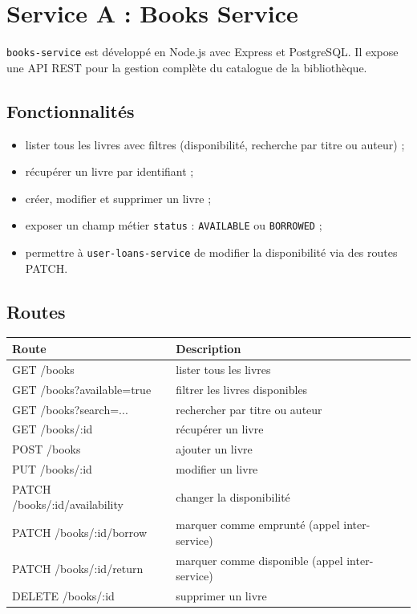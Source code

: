\documentclass[12pt,a4paper]{article}
\begin{document}
\section{Service A : Books Service}

\texttt{books-service} est développé en Node.js avec Express et PostgreSQL.
Il expose une API REST pour la gestion complète du catalogue de la bibliothèque.

\subsection{Fonctionnalités}

\begin{itemize}[leftmargin=*]
  \item lister tous les livres avec filtres (disponibilité, recherche par titre ou auteur) ;
  \item récupérer un livre par identifiant ;
  \item créer, modifier et supprimer un livre ;
  \item exposer un champ métier \texttt{status} : \texttt{AVAILABLE} ou \texttt{BORROWED} ;
  \item permettre à \texttt{user-loans-service} de modifier la disponibilité via des routes PATCH.
\end{itemize}

\subsection{Routes}

\begin{center}
\begin{tabular}{>{\ttfamily}p{5.5cm} p{7cm}}
\toprule
Route & Description \\
\midrule
GET /books                    & lister tous les livres \\
GET /books?available=true     & filtrer les livres disponibles \\
GET /books?search=...         & rechercher par titre ou auteur \\
GET /books/:id                & récupérer un livre \\
POST /books                   & ajouter un livre \\
PUT /books/:id                & modifier un livre \\
PATCH /books/:id/availability & changer la disponibilité \\
PATCH /books/:id/borrow       & marquer comme emprunté (appel inter-service) \\
PATCH /books/:id/return       & marquer comme disponible (appel inter-service) \\
DELETE /books/:id             & supprimer un livre \\
\bottomrule
\end{tabular}
\end{center}
\end{document}
